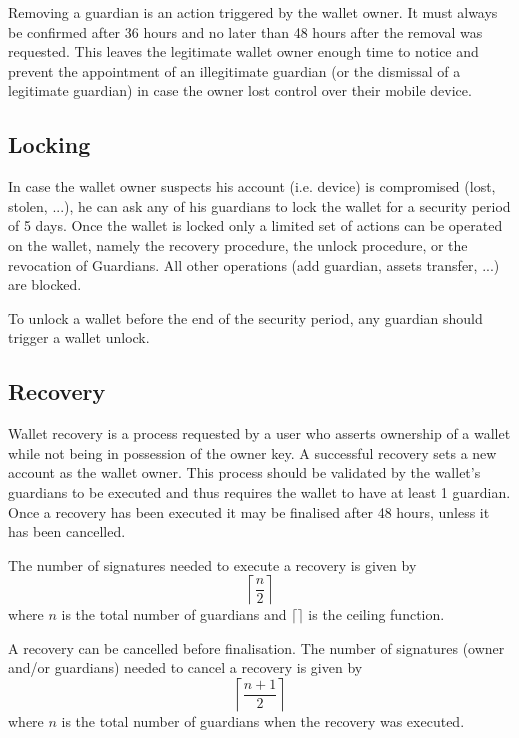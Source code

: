 \documentclass[12pt]{article}
\begin{document}
Removing a guardian is an action triggered by the wallet owner. It must always be confirmed after 36 hours and no later than 48 hours after the removal was requested. This leaves the legitimate wallet owner enough time to notice and prevent the appointment of an illegitimate guardian (or the dismissal of a legitimate guardian) in case the owner lost control over their mobile device.

\subsection{Locking}

In case the wallet owner suspects his account (i.e. device) is compromised (lost, stolen, ...), he can ask any of his guardians to lock the wallet for a security period of 5 days. Once the wallet is locked only a limited set of actions can be operated on the wallet, namely the recovery procedure, the unlock procedure, or the revocation of Guardians. All other operations (add guardian, assets transfer, ...) are blocked.

To unlock a wallet before the end of the security period, any guardian should trigger a wallet unlock.

\subsection{Recovery}

Wallet recovery is a process requested by a user who asserts ownership of a wallet while not being in possession of the owner key. A successful recovery sets a new account as the wallet owner. This process should be validated by the wallet's guardians to be executed and thus requires the wallet to have at least 1 guardian. Once a recovery has been executed it may be finalised after 48 hours, unless it has been cancelled.

The number of signatures needed to execute a recovery is given by
\begin{equation*}
    \left\lceil {\frac{n}{2}} \right\rceil
\end{equation*}
where $n$ is the total number of guardians and $\lceil\rceil$ is the ceiling function.

A recovery can be cancelled before finalisation. The number of signatures (owner and/or guardians) needed to cancel a recovery is given by
\begin{equation*}
    \left\lceil {\frac{n+1}{2}} \right\rceil
\end{equation*}
where $n$ is the total number of guardians when the recovery was executed.
\end{document}
